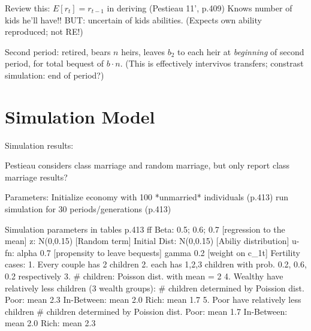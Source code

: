 \documentclass{article}
\begin{document}
Review this:
$E[r_t] = r_{t-1}$ in deriving (Pestieau 11',  p.409)
Knows number of kids he'll have!!
BUT: uncertain of kids abilities.
(Expects own ability reproduced; not RE!)

Second period:
retired,
bears $n$ heirs,
leaves $b_{2}$ to each heir at \emph{beginning} of second period,
for total bequest of $b \cdot n$.
(This is effectively intervivos transfers;
constrast simulation: end of period?)


\section{Simulation Model}

Simulation results:

Pestieau considers class marriage and random marriage, but only report class marriage results?

\begin{verbatimtab}
Parameters:
	Initialize economy with 100 *unmarried* individuals (p.413)
	run simulation for 30 periods/generations (p.413)

Simulation parameters in tables p.413 ff
	Beta:			0.5; 0.6; 0.7	[regression to the mean]
	z: 				N(0,0.15)		[Random term]
	Initial Dist:	N(0,0.15)		[Abiliy distribution]
	u-fn:	alpha	0.7				[propensity to leave bequests]
			gamma	0.2				[weight on c_1t]
	Fertility cases:
		1. Every couple has 2 children
		2. each has 1,2,3 children with prob. 0.2, 0.6, 0.2 respectively
		3. # children: Poisson dist. with mean = 2
		4. Wealthy have relatively less children (3 wealth groups): 
			# children determined by Poission dist. 
			Poor: 		mean 2.3
			In-Between: mean 2.0
			Rich:		mean 1.7
		5. Poor have relatively less children 
			# children determined by Poission dist.
			Poor:		mean 1.7
			In-Between:	mean 2.0
			Rich:		mean 2.3
\end{verbatimtab}
\end{document}
